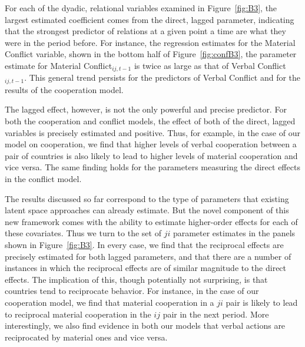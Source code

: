 \documentclass[3p,times,twocolumn,authoryear,12pt]{elsarticle}
\begin{document}
For each of the dyadic, relational variables examined in Figure~\ref{fig:B3}, the largest estimated coefficient comes from the direct, lagged parameter, indicating that the strongest predictor of relations at a given point a time are what they were in the period before. For instance, the regression estimates for the Material Conflict variable, shown in the bottom half of Figure~\ref{fig:confB3}, the parameter estimate for Material Conflict$_{ij, t-1}$ is twice as large as that of Verbal Conflict$_{ij, t-1}$. This general trend persists for the predictors of Verbal Conflict and for the results of the cooperation model. 

The lagged effect, however, is not the only powerful and precise predictor. For both the cooperation and conflict models, the effect of both of the direct, lagged variables is precisely estimated and positive. Thus, for example, in the case of our model on cooperation, we find that higher levels of verbal cooperation between a pair of countries is also likely to lead to higher levels of material cooperation and vice versa. The same finding holds for the parameters measuring the direct effects in the conflict model.

The results discussed so far correspond to the type of parameters that existing latent space approaches can already estimate. But the novel component of this new framework comes with the ability to estimate higher-order effects for each of these covariates. Thus we turn to the set of $ji$ parameter estimates in the panels shown in Figure~\ref{fig:B3}. In every case, we find that the reciprocal effects are precisely estimated for both lagged parameters, and that there are a number of instances in which the reciprocal effects are of similar magnitude to the direct effects. The implication of this, though potentially not surprising, is that countries tend to reciprocate behavior. For instance, in the case of our cooperation model, we find that material cooperation in a $ji$ pair is likely to lead to reciprocal material cooperation in the $ij$ pair in the next period. More interestingly, we also find evidence in both our models that verbal actions are reciprocated by material ones and vice versa. 
\end{document}
